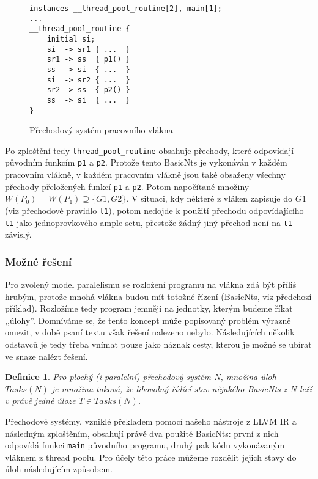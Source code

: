 \documentclass[12pt]{fithesis2}
\newtheorem{definition}{Definice}
\begin{document}
\begin{figure}
\begin{lstlisting}
instances __thread_pool_routine[2], main[1];
...
__thread_pool_routine {
	initial	si;
	si  -> sr1 { ...  }
	sr1 -> ss  { p1() }
	ss  -> si  { ...  }
	si  -> sr2 { ...  }
	sr2 -> ss  { p2() }
	ss  -> si  { ...  }
}
\end{lstlisting}
\caption{Přechodový systém pracovního vlákna}
\end{figure}

Po zploštění tedy \texttt{thread\_pool\_routine} obsahuje přechody, které odpovídají původním funkcím \texttt{p1} a \texttt{p2}. Protože tento BasicNts je vykonáván v každém pracovním vlákně, v každém pracovním vlákně jsou také obsaženy všechny přechody přeložených funkcí \texttt{p1} a \texttt{p2}. Potom napočítané množiny $W(P_0) = W(P_1) \supseteq \{ G1, G2\}$. V situaci, kdy některé z vláken zapisuje do $G1$ (viz přechodové pravidlo \texttt{t1}), potom nedojde k použití přechodu odpovídajícího \texttt{t1} jako jednoprovkového ample setu, přestože žádný jiný přechod není na \texttt{t1} závislý. 

\subsubsection{Možné řešení}
Pro zvolený model paralelismu se rozložení programu na vlákna zdá být příliš hrubým, protože mnohá vlákna budou mít totožné řízení (BasicNts, viz předchozí příklad). Rozložíme tedy program jemněji na jednotky, kterým budeme říkat ,,úlohy''. Domníváme se, že tento koncept může popisovaný problém výrazně omezit, v době psaní textu však řešení nalezeno nebylo. Následujících několik odstavců je tedy třeba vnímat pouze jako náznak cesty, kterou je možné se ubírat ve snaze nalézt řešení.

\begin{definition}
Pro plochý (i paralelní) přechodový systém N, množina úloh $\mathit{Tasks}(N)$ je množina taková, že libovolný řídící stav nějakého BasicNts z N leží v právě jedné úloze $T \in \mathit{Tasks}(N)$.
\end{definition}

Přechodové systémy, vzniklé překladem pomocí našeho nástroje z LLVM IR a následným zploštěním, obsahují právě dva použité BasicNts: první z nich odpovídá funkci \texttt{main} původního programu, druhý pak kódu vykonávaným vláknem z thread poolu. Pro účely této práce můžeme rozdělit jejich stavy do úloh následujícím způsobem.
\end{document}
